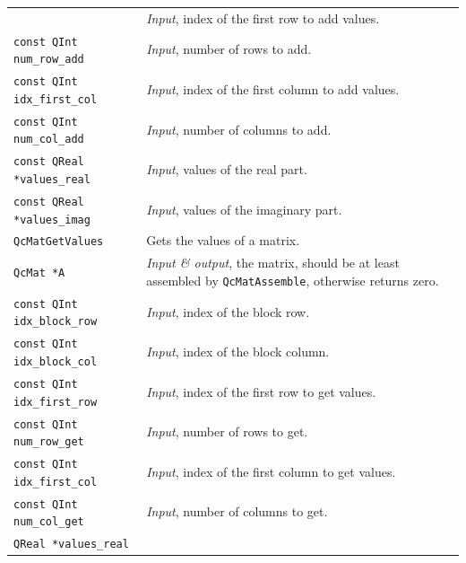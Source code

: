 \documentclass[a4paper,11pt,twoside,openright]{book}
\begin{document}
\begin{center}
\begin{longtable}{l|p{}}
      & \textsl{Input}, index of the first row to add values.\\
    \hspace*{2ex}\verb|const QInt num_row_add| %
      & \textsl{Input}, number of rows to add.\\
    \hspace*{2ex}\verb|const QInt idx_first_col| %
      & \textsl{Input}, index of the first column to add values.\\
    \hspace*{2ex}\verb|const QInt num_col_add| %
      & \textsl{Input}, number of columns to add.\\
    \hspace*{2ex}\verb|const QReal *values_real| %
      & \textsl{Input}, values of the real part.\\
    \hspace*{2ex}\verb|const QReal *values_imag| %
      & \textsl{Input}, values of the imaginary part.\\
    \hline
%
    \verb|QcMatGetValues|\index{\texttt{QcMatGetValues}} %
      & Gets the values of a matrix.\\
    \hspace*{2ex}\verb|QcMat *A| %
      & \textsl{Input \& output}, the matrix, should be at least assembled by
        \verb|QcMatAssemble|, otherwise returns zero.\\
    \hspace*{2ex}\verb|const QInt idx_block_row| %
      & \textsl{Input}, index of the block row.\\
    \hspace*{2ex}\verb|const QInt idx_block_col| %
      & \textsl{Input}, index of the block column.\\
    \hspace*{2ex}\verb|const QInt idx_first_row| %
      & \textsl{Input}, index of the first row to get values.\\
    \hspace*{2ex}\verb|const QInt num_row_get| %
      & \textsl{Input}, number of rows to get.\\
    \hspace*{2ex}\verb|const QInt idx_first_col| %
      & \textsl{Input}, index of the first column to get values.\\
    \hspace*{2ex}\verb|const QInt num_col_get| %
      & \textsl{Input}, number of columns to get.\\
    \hspace*{2ex}\verb|QReal *values_real| %

\end{longtable}
\end{center}
\end{document}
